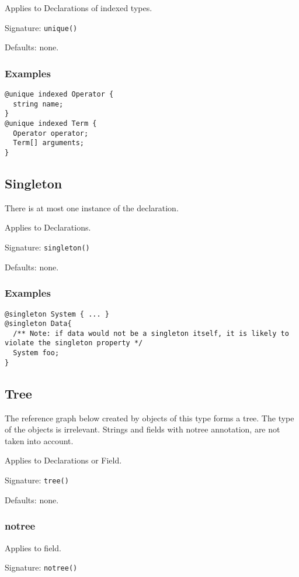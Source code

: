\documentclass[a4paper,10pt]{article}
\begin{document}
Applies to Declarations of indexed types.

Signature: \verb/unique()/

Defaults: none.

\subsubsection*{Examples}

\begin{verbatim}
@unique indexed Operator {
  string name;
}
@unique indexed Term {
  Operator operator;
  Term[] arguments;
}
\end{verbatim}


\subsection*{Singleton}
There is at most one instance of the declaration.

Applies to Declarations.

Signature: \verb/singleton()/

Defaults: none.

\subsubsection*{Examples}

\begin{verbatim}
@singleton System { ... }
@singleton Data{
  /** Note: if data would not be a singleton itself, it is likely to violate the singleton property */
  System foo;
}
\end{verbatim}


\subsection*{Tree}
The reference graph below created by objects of this type forms a tree. The type of the objects is irrelevant. Strings and fields with notree annotation, are not taken into account.

Applies to Declarations or Field.

Signature: \verb/tree()/

Defaults: none.


\subsubsection*{notree}
Applies to field.

Signature: \verb/notree()/
\end{document}

